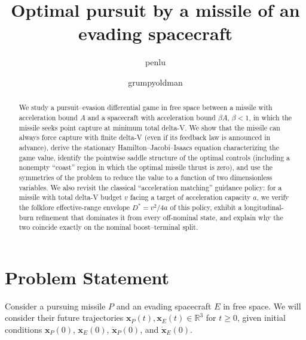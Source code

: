 \documentclass{article}
\renewcommand{\vec}[1]{\mathbf{#1}}
\theoremstyle{remark}
\begin{document}
\title{Optimal pursuit by a missile of an evading spacecraft}
\author{penlu \and grumpyoldman}

\maketitle

\begin{abstract}
  We study a pursuit--evasion differential game in free space between a
  missile with acceleration bound $A$ and a spacecraft with acceleration bound
  $\beta A$, $\beta < 1$, in which the missile seeks point capture at minimum
  total delta-V.  We show that the missile can always force capture with
  finite delta-V (even if its feedback law is announced in advance), derive
  the stationary Hamilton--Jacobi--Isaacs equation characterizing the game
  value, identify the pointwise saddle structure of the optimal controls
  (including a nonempty ``coast'' region in which the optimal missile thrust
  is zero), and use the symmetries of the problem to reduce the value to a
  function of two dimensionless variables.  We also revisit the classical
  ``acceleration matching'' guidance policy: for a missile with total delta-V
  budget $v$ facing a target of acceleration capacity $a$, we verify the
  folklore effective-range envelope $D^* = v^2/4a$ of this policy, exhibit a
  longitudinal-burn refinement that dominates it from every off-nominal
  state, and explain why the two coincide exactly on the nominal
  boost--terminal split.
\end{abstract}

\section{Problem Statement}
\label{sec:problem}
\newcommand{\R}{\mathbb{R}}

Consider a pursuing missile $P$ and an evading spacecraft $E$ in free space.  We
will consider their future trajectories $\vec{x}_P(t), \vec{x}_E(t) \in \R^3$ for $t \ge 0$,
given initial conditions $\vec{x}_P(0)$, $\vec{x}_E(0)$, $\dot{\vec{x}}_P(0)$, and $\dot{\vec{x}}_E(0)$.
\end{document}
